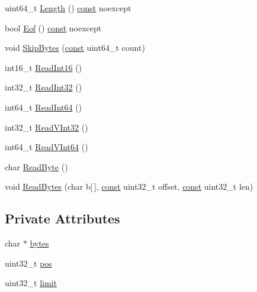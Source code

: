 \begin{DoxyCompactItemize}
\item 
uint64\+\_\+t \mbox{\hyperlink{classlucene_1_1core_1_1store_1_1ByteArrayReferenceDataInput_a9ed3affcaa35365c2f1635b1180190c6}{Length}} () \mbox{\hyperlink{ZlibCrc32_8h_a2c212835823e3c54a8ab6d95c652660e}{const}} noexcept
\item 
bool \mbox{\hyperlink{classlucene_1_1core_1_1store_1_1ByteArrayReferenceDataInput_a131e5fc9e118a77d670513d6f48b5d3f}{Eof}} () \mbox{\hyperlink{ZlibCrc32_8h_a2c212835823e3c54a8ab6d95c652660e}{const}} noexcept
\item 
void \mbox{\hyperlink{classlucene_1_1core_1_1store_1_1ByteArrayReferenceDataInput_adcd3d12fe94d7be80d8c402ccc62cdf8}{Skip\+Bytes}} (\mbox{\hyperlink{ZlibCrc32_8h_a2c212835823e3c54a8ab6d95c652660e}{const}} uint64\+\_\+t count)
\item 
int16\+\_\+t \mbox{\hyperlink{classlucene_1_1core_1_1store_1_1ByteArrayReferenceDataInput_ad2364c5c8e9de32da1af2c0806776d8e}{Read\+Int16}} ()
\item 
int32\+\_\+t \mbox{\hyperlink{classlucene_1_1core_1_1store_1_1ByteArrayReferenceDataInput_a03f2d5ee9d204ec1afcc60d908debf60}{Read\+Int32}} ()
\item 
int64\+\_\+t \mbox{\hyperlink{classlucene_1_1core_1_1store_1_1ByteArrayReferenceDataInput_a7e57de83aabc19fa44228bb2ee039d2e}{Read\+Int64}} ()
\item 
int32\+\_\+t \mbox{\hyperlink{classlucene_1_1core_1_1store_1_1ByteArrayReferenceDataInput_a2d9ccc48e09d9794d2ca2ae3577bd44b}{Read\+V\+Int32}} ()
\item 
int64\+\_\+t \mbox{\hyperlink{classlucene_1_1core_1_1store_1_1ByteArrayReferenceDataInput_a607628859721dc59ff3d92bcf740dbf1}{Read\+V\+Int64}} ()
\item 
char \mbox{\hyperlink{classlucene_1_1core_1_1store_1_1ByteArrayReferenceDataInput_a2e711c547ea22188302c7417509e7cca}{Read\+Byte}} ()
\item 
void \mbox{\hyperlink{classlucene_1_1core_1_1store_1_1ByteArrayReferenceDataInput_ac0630806e8d4c3468b9531e16b00291c}{Read\+Bytes}} (char b\mbox{[}$\,$\mbox{]}, \mbox{\hyperlink{ZlibCrc32_8h_a2c212835823e3c54a8ab6d95c652660e}{const}} uint32\+\_\+t offset, \mbox{\hyperlink{ZlibCrc32_8h_a2c212835823e3c54a8ab6d95c652660e}{const}} uint32\+\_\+t len)
\end{DoxyCompactItemize}
\subsection*{Private Attributes}
\begin{DoxyCompactItemize}
\item 
char $\ast$ \mbox{\hyperlink{classlucene_1_1core_1_1store_1_1ByteArrayReferenceDataInput_ac71ae2183a9bd8ee669a7d5212a48d48}{bytes}}
\item 
uint32\+\_\+t \mbox{\hyperlink{classlucene_1_1core_1_1store_1_1ByteArrayReferenceDataInput_a08a5b6f56250b88d45078a667a9826c6}{pos}}
\item 
uint32\+\_\+t \mbox{\hyperlink{classlucene_1_1core_1_1store_1_1ByteArrayReferenceDataInput_a01a06c545971f76e716ef9c5e4dd6cb0}{limit}}
\end{DoxyCompactItemize}


